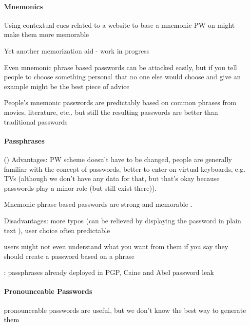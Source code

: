 	\paragraph{Mnemonics}
	Using contextual cues related to a website to base a mnemonic PW on might make them more memorable \cite{Mcevoy2016ContextualizingMnemonicPhrase}
	
	Yet another memorization aid - work in progress \cite{Lyastani2016PWMangling} 
	
	Even mnemonic phrase based passwords can be attacked easily, but if you tell people to choose something personal that no one else would choose and give an example might be the best piece of advice \cite{Yang2016MnemonicSentenceBased}
	
	People's mnemonic passwords are predictably based on common phrases from movies, literature, etc., but still the resulting passwords are better than traditional passwords \cite{Kuo2006HumanSelectionMnemonic}
	
	\paragraph{Passphrases}\label{sec:rw:passphrases}
	()
	Advantages: PW scheme doesn't have to be changed, people are generally familiar with the concept of passwords, better to enter on virtual keyboards, e.g. TVs (although we don't have any data for that, but that's okay because passwords play a minor role (but still exist there)).
	
	Mnemonic phrase based passwords are strong and memorable \cite{Yan2004PasswordMemorabilitySecurity}.
	
	\cite{Keith2009PassphraseDesign}
	
	Disadvantages: more typos (can be relieved by displaying the password in plain text  \cite{Melicher2016UsabilityMobileTextPasswords}), user choice often predictable
	
	users might not even understand what you want from them if you say they should create a password based on a phrase \cite{Forget2007HelpingUsers}
	
	\cite{Bonneau2012LinguisticProperties}: passphrases already deployed in PGP, Caine and Abel password leak \cite{Carnavalet2014AnalyzingPWStrengthMeters} 
	
	\cite{Shay2012CorrectHorseBatteryStaple}
	
	
	\paragraph{Pronounceable Passwords}
	pronounceable passwords are useful, but we don't know the best way to generate them \cite{Goldberg2015UnspeakablePasswords}
	
